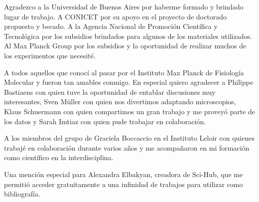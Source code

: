 Agradezco a la Universidad de Buenos Aires por haberme formado y brindado lugar de trabajo. A CONICET por su apoyo en el proyecto de doctorado propuesto y becado. A la Agencia Nacional de Promoción Científica y Tecnológica por los subsidios brindados para algunos de los materiales utilizados. Al Max Planck Group por los subsidios y la oportunidad de realizar muchos de los experimentos que necesité.

A todos aquellos que conocí al pasar por el Instituto Max Planck de Fisiología Molecular y fueron tan amables conmigo. En especial quiero agradecer a Philippe Bastiaens con quien tuve la oportunidad de entablar discusiones muy interesantes, Sven Müller con quien nos divertimos adaptando microscopios, Klaus Schuermann con quien compartimos un gran trabajo y me proveyó parte de los datos y Sarah Imtiaz con quien pude trabajar en colaboración.

A los miembros del grupo de Graciela Boccaccio en el Instituto Leloir con quienes trabajé en colaboración durante varios años y me acompañaron en mi formación como científico en la interdisciplina.

Una mención especial para Alexandra Elbakyan, creadora de Sci-Hub, que me permitió acceder gratuitamente a una infinidad de trabajos para utilizar como bibliografía.